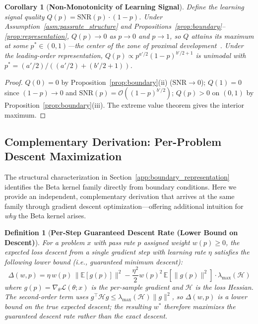 \documentclass{article}
\newtheorem{corollary}[theorem]{Corollary}
\newtheorem{definition}{Definition}
\begin{document}
\begin{corollary}[\textbf{Non-Monotonicity of Learning Signal}]
\label{prop:zpd}
Define the learning signal quality $Q(p) = \text{SNR}(p) \cdot (1 - p)$. Under Assumption~\ref{asm:passrate_structure} and Propositions~\ref{prop:boundary}--\ref{prop:representation}, $Q(p) \to 0$ as $p \to 0$ and $p \to 1$, so $Q$ attains its maximum at some $p^* \in (0,1)$---the center of the zone of proximal development~\citep{vygotsky1978mind}. Under the leading-order representation, $Q(p) \propto p^{a'/2}(1-p)^{b'/2+1}$ is unimodal with $p^* = (a'/2)/((a'/2)+(b'/2+1))$.
\end{corollary}
\begin{proof}
$Q(0) = 0$ by Proposition~\ref{prop:boundary}(ii) ($\text{SNR} \to 0$); $Q(1) = 0$ since $(1-p) \to 0$ and $\text{SNR}(p) = \mathcal{O}((1-p)^{b'/2})$; $Q(p) > 0$ on $(0,1)$ by Proposition~\ref{prop:boundary}(iii). The extreme value theorem gives the interior maximum.
\end{proof}

\subsection{Complementary Derivation: Per-Problem Descent Maximization}
\label{app:proof_beta}

The structural characterization in Section~\ref{app:boundary_representation} identifies the Beta kernel family directly from boundary conditions. Here we provide an independent, complementary derivation that arrives at the same family through gradient descent optimization---offering additional intuition for \emph{why} the Beta kernel arises.

\begin{definition}[\textbf{Per-Step Guaranteed Descent Rate (Lower Bound on Descent)}]
\label{def:descent}
For a problem $x$ with pass rate $p$ assigned weight $w(p) \geq 0$, the expected loss descent from a single gradient step with learning rate $\eta$ satisfies the following \emph{lower bound} (i.e., guaranteed minimum descent):
\begin{equation}
  \Delta(w, p) = \eta \, w(p) \, \|\mathbb{E}[g(p)]\|^2 - \frac{\eta^2}{2} w(p)^2 \, \mathbb{E}[\|g(p)\|^2] \cdot \lambda_{\max}(\mathcal{H})
\end{equation}
where $g(p) = \nabla_\theta \mathcal{L}(\theta; x)$ is the per-sample gradient and $\mathcal{H}$ is the loss Hessian. The second-order term uses $g^\top \mathcal{H} g \leq \lambda_{\max}(\mathcal{H})\|g\|^2$, so $\Delta(w,p)$ is a \emph{lower bound} on the true expected descent; the resulting $w^*$ therefore maximizes the \emph{guaranteed} descent rate rather than the exact descent.
\end{definition}
\end{document}
